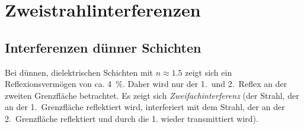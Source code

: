 
\section{Zweistrahlinterferenzen}
\subsection{Interferenzen dünner Schichten}
Bei dünnen, dielektrischen Schichten mit $n\approx\num{1.5}$ zeigt
sich ein Reflexionsvermögen von ca. \SI{4}{\percent}.
Daher wird nur der 1.~und 2.~Reflex an der zweiten Grenzfläche
betrachtet. Es zeigt sich \emph{Zweifachinterferenz} (der Strahl, der an der
1.~Grenzfläche reflektiert wird, interferiert mit dem Strahl, der an der
2.~Grenzfläche reflektiert und durch die 1. wieder transmittiert wird).

